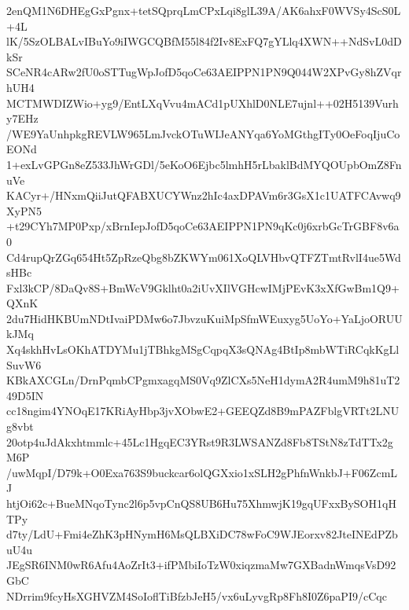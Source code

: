 2enQM1N6DHEgGxPgnx+tetSQprqLmCPxLqi8glL39A/AK6ahxF0WVSy4ScS0L+4L
lK/5SzOLBALvIBuYo9iIWGCQBfM55l84f2Iv8ExFQ7gYLlq4XWN++NdSvL0dDkSr
SCeNR4cARw2fU0oSTTugWpJofD5qoCe63AEIPPN1PN9Q044W2XPvGy8hZVqrhUH4
MCTMWDIZWio+yg9/EntLXqVvu4mACd1pUXhlD0NLE7ujnl++02H5139Vurhy7EHz
/WE9YaUnhpkgREVLW965LmJvckOTuWIJeANYqa6YoMGthgITy0OeFoqIjuCoEONd
1+exLvGPGn8eZ533JhWrGDl/5eKoO6Ejbc5lmhH5rLbaklBdMYQOUpbOmZ8FnuVe
KACyr+/HNxmQiiJutQFABXUCYWnz2hIc4axDPAVm6r3GsX1c1UATFCAvwq9XyPN5
+t29CYh7MP0Pxp/xBrnIepJofD5qoCe63AEIPPN1PN9qKc0j6xrbGcTrGBF8v6a0
Cd4rupQrZGq654Ht5ZpRzeQbg8bZKWYm061XoQLVHbvQTFZTmtRvlI4ue5WdsHBc
Fxl3kCP/8DaQv8S+BmWcV9Gklht0a2iUvXIlVGHcwIMjPEvK3xXfGwBm1Q9+QXnK
2du7HidHKBUmNDtIvaiPDMw6o7JbvzuKuiMpSfmWEuxyg5UoYo+YaLjoORUUkJMq
Xq4skhHvLsOKhATDYMu1jTBhkgMSgCqpqX3sQNAg4BtIp8mbWTiRCqkKgLlSuvW6
KBkAXCGLn/DrnPqmbCPgmxagqMS0Vq9ZlCXs5NeH1dymA2R4umM9h81uT249D5IN
cc18ngim4YNOqE17KRiAyHbp3jvXObwE2+GEEQZd8B9mPAZFblgVRTt2LNUg8vbt
20otp4uJdAkxhtmmlc+45Lc1HgqEC3YRst9R3LWSANZd8Fb8TStN8zTdTTx2gM6P
/uwMqpI/D79k+O0Exa763S9buckcar6olQGXxio1xSLH2gPhfnWnkbJ+F06ZcmLJ
htjOi62c+BueMNqoTync2l6p5vpCnQS8UB6Hu75XhmwjK19gqUFxxBySOH1qHTPy
d7ty/LdU+Fmi4eZhK3pHNymH6MsQLBXiDC78wFoC9WJEorxv82JteINEdPZbuU4u
JEgSR6INM0wR6Afu4AoZrIt3+ifPMbiIoTzW0xiqzmaMw7GXBadnWmqsVsD92GbC
NDrrim9fcyHsXGHVZM4SoIoflTiBfzbJeH5/vx6uLyvgRp8Fh8I0Z6paPI9/cCqc

